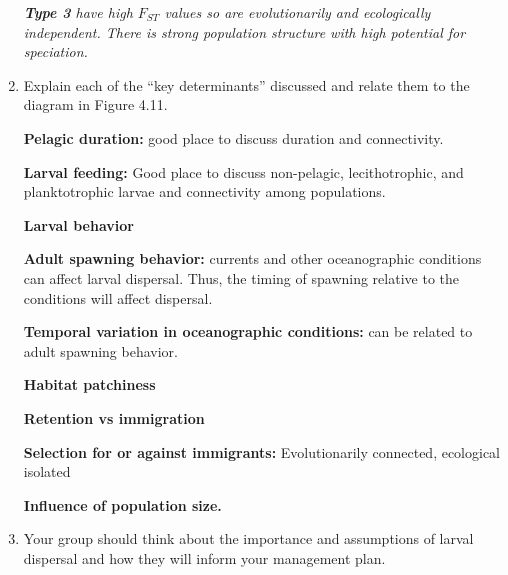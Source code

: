 \documentclass[letterpaper]{tufte-handout}
\begin{document}
\begin{enumerate}
	\textit{\textbf{Type 3} have high $F_{ST}$ values so are evolutionarily and ecologically independent. There is strong population structure with high potential for speciation.}
	
	\item Explain each of the ``key determinants'' discussed and relate them to the diagram in Figure 4.11. 
	
	\textbf{Pelagic duration:} good place to discuss duration and connectivity.
	
	\textbf{Larval feeding:} Good place to discuss non-pelagic, lecithotrophic, and planktotrophic larvae and connectivity among populations.
	
	\textbf{Larval behavior}
	
	\textbf{Adult spawning behavior:} currents and other oceanographic conditions can affect larval dispersal. Thus, the timing of spawning relative to the conditions will affect dispersal.
	
	\textbf{Temporal variation in oceanographic conditions:} can be related to adult spawning behavior.
	
	\textbf{Habitat patchiness}
	
	\textbf{Retention vs immigration}
	
	\textbf{Selection for or against immigrants:} Evolutionarily connected, ecological isolated
	
	\textbf{Influence of population size.}

	\item Your group should think about the importance and assumptions of larval dispersal and how they will inform your management plan.
	

	
	
\end{enumerate}
\end{document}
